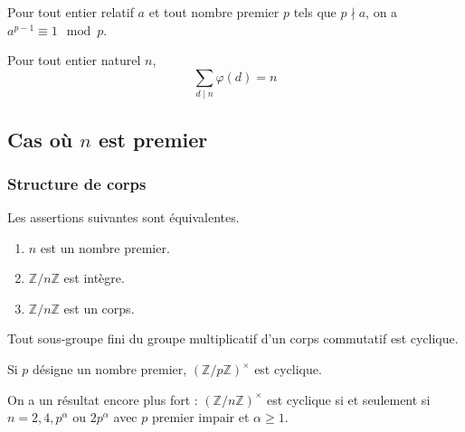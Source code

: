   \begin{proposition}
    Pour tout entier relatif $a$ et tout nombre premier $p$ tels que $p \nmid a$, on a $a^{p-1} \equiv 1 \mod p$.
  \end{proposition}

  \begin{proposition}
    Pour tout entier naturel $n$,
    \[ \sum_{d \mid n} \varphi(d) = n \]
  \end{proposition}

  \subsection{Cas où \texorpdfstring{$n$}{n} est premier}

  \subsubsection{Structure de corps}

  \begin{proposition}
    Les assertions suivantes sont équivalentes.
    \begin{enumerate}[label={\bfseries(\roman*)}]
      \item $n$ est un nombre premier.
      \item $\mathbb{Z}/n\mathbb{Z}$ est intègre.
      \item $\mathbb{Z}/n\mathbb{Z}$ est un corps.
    \end{enumerate}
  \end{proposition}


  \begin{theorem}
    Tout sous-groupe fini du groupe multiplicatif d'un corps commutatif est cyclique.
  \end{theorem}

  \begin{corollary}
    Si $p$ désigne un nombre premier, $(\mathbb{Z}/p\mathbb{Z})^\times$ est cyclique.
  \end{corollary}


  \begin{remark}
    On a un résultat encore plus fort : $(\mathbb{Z}/n\mathbb{Z})^\times$ est cyclique si et seulement si $n = 2, 4, p^\alpha \text{ ou } 2p^\alpha$ avec $p$ premier impair et $\alpha \geq 1$.
  \end{remark}

